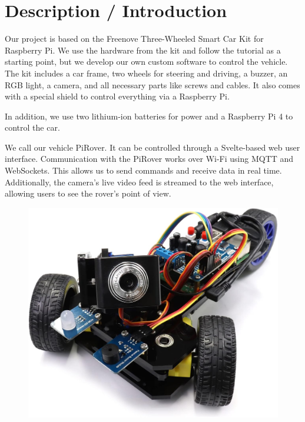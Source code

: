 \section{Description / Introduction}

Our project is based on the Freenove Three-Wheeled Smart Car Kit for Raspberry Pi. We use the hardware from the kit and follow the tutorial as a starting point, but we develop our own custom software to control the vehicle.
The kit includes a car frame, two wheels for steering and driving, a buzzer, an RGB light, a camera, and all necessary parts like screws and cables. It also comes with a special shield to control everything via a Raspberry Pi.

In addition, we use two lithium-ion batteries for power and a Raspberry Pi 4 to control the car.

We call our vehicle PiRover. It can be controlled through a Svelte-based web user interface. Communication with the PiRover works over Wi-Fi using MQTT and WebSockets. This allows us to send commands and receive data in real time.
Additionally, the camera’s live video feed is streamed to the web interface, allowing users to see the rover’s point of view.


\begin{figure}[h!]
    \includegraphics[width=15cm]{img/freenove_smartcar_imagepicture}
\end{figure}
